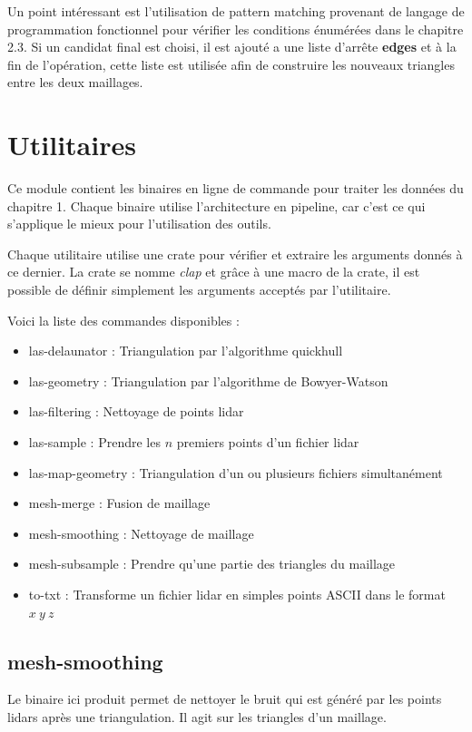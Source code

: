 Un point intéressant est l'utilisation de pattern matching provenant de langage de programmation fonctionnel pour vérifier les conditions énumérées dans le chapitre 2.3. Si un candidat final est choisi, il est ajouté a une liste d'arrête \textbf{edges} et à la fin de l'opération, cette liste est utilisée afin de construire les nouveaux triangles entre les deux maillages.

\section{Utilitaires}

Ce module contient les binaires en ligne de commande pour traiter les données du
chapitre 1.
Chaque binaire utilise l'architecture en pipeline, car c'est ce qui s'applique le
mieux pour l'utilisation des outils.

Chaque utilitaire utilise une crate pour vérifier et extraire les arguments
donnés à ce dernier. La crate se nomme \textit{clap} et grâce à une macro de la
crate, il est possible de définir simplement les arguments acceptés par 
l'utilitaire.

Voici la liste des commandes disponibles :
\begin{itemize}
	\item las-delaunator : Triangulation par l'algorithme quickhull
	\item las-geometry : Triangulation par l'algorithme de Bowyer-Watson
	\item las-filtering : Nettoyage de points lidar
	\item las-sample : Prendre les $n$ premiers points d'un fichier lidar
	\item las-map-geometry : Triangulation d'un ou plusieurs fichiers
		simultanément
	\item mesh-merge : Fusion de maillage
	\item mesh-smoothing : Nettoyage de maillage
	\item mesh-subsample : Prendre qu'une partie des triangles du maillage
	\item to-txt : Transforme un fichier lidar en simples points ASCII dans le
		format $x\ y\ z$
\end{itemize}

\subsection{mesh-smoothing}

Le binaire ici produit permet de nettoyer le bruit qui est généré par les points
lidars après une triangulation. Il agit sur les triangles d'un maillage.

